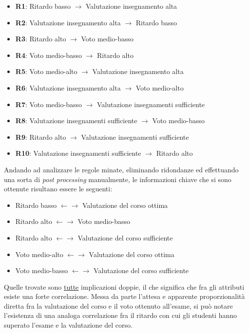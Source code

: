             \begin{itemize}
                \item \textbf{R1}: Ritardo basso $\rightarrow$ Valutazione insegnamento alta
                \item \textbf{R2}: Valutazione insegnamento alta $\rightarrow$ Ritardo basso
                \item \textbf{R3}: Ritardo alto $\rightarrow$ Voto medio-basso
                \item \textbf{R4}: Voto medio-basso $\rightarrow$ Ritardo alto
                \item \textbf{R5}: Voto medio-alto $\rightarrow$ Valutazione insegnamento alta
                \item \textbf{R6}: Valutazione insegnamento alta $\rightarrow$ Voto medio-alto
                \item \textbf{R7}: Voto medio-basso $\rightarrow$ Valutazione insegnamenti sufficiente
                \item \textbf{R8}: Valutazione insegnamenti sufficiente $\rightarrow$ Voto medio-basso
                \item \textbf{R9}: Ritardo alto $\rightarrow$ Valutazione insegnamenti sufficiente
                \item \textbf{R10}: Valutazione insegnamenti sufficiente $\rightarrow$ Ritardo alto
            \end{itemize}

            Andando ad analizzare le regole minate, eliminando ridondanze ed effettuando una sorta di \textit{post processing} manualmente, le informazioni chiave che si sono ottenute risultano essere le seguenti:

            \begin{itemize}
                \item Ritardo basso $\leftarrow \rightarrow$ Valutazione del corso ottima
                \item Ritardo alto $\leftarrow \rightarrow$ Voto medio-basso
                \item Ritardo alto $\leftarrow \rightarrow$ Valutazione del corso sufficiente
                \item Voto medio-alto $\leftarrow \rightarrow$ Valutazione del corso ottima
                \item Voto medio-basso $\leftarrow \rightarrow$ Valutazione del corso sufficiente
            \end{itemize}

            Quelle trovate sono \underline{tutte} implicazioni doppie, il che significa che fra gli attributi esiste una forte correlazione. Messa da parte l'attesa e apparente proporzionalità diretta fra la valutazione del corso e il voto ottenuto all'esame, si può notare l'esistenza di una analoga correlazione fra il ritardo con cui gli studenti hanno superato l'esame e la valutazione del corso.

